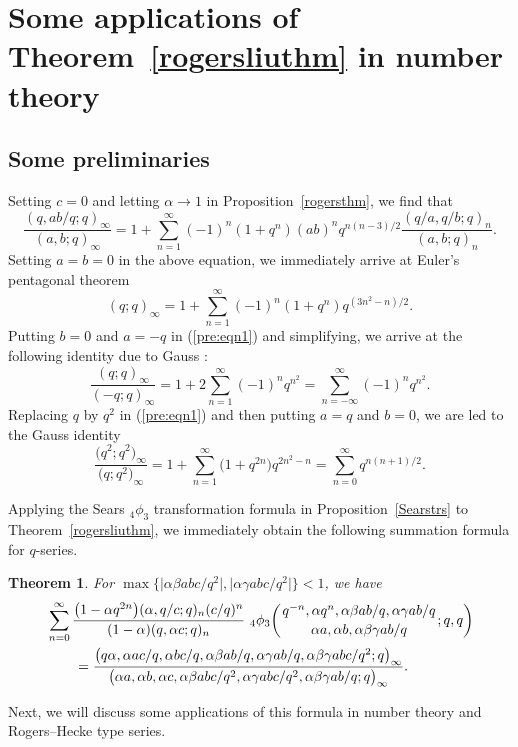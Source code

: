 \documentclass[pdftex]{sigma}
\numberwithin{equation}{section}
\newtheorem{Theorem}{Theorem}[section]
\begin{document}
\section{Some applications of Theorem~\ref{rogersliuthm} in number theory}\label{sec4}
\subsection{Some preliminaries}
Setting $c=0$ and letting $\alpha \to 1$ in Proposition~\ref{rogersthm}, we find that
\begin{equation} \label{pre:eqn1}
	\frac{(q, ab/q; q)_\infty}{(a, b; q)_\infty}
	=1+\sum_{n=1}^\infty (-1)^n (1+q^n) (ab)^n q^{n(n-3)/2} \frac{(q/a, q/b; q)_n}{(a, b; q)_n}.
\end{equation}
Setting $a=b=0$ in the above equation, we immediately arrive at Euler's pentagonal theo\-rem~\mbox{\cite[equation~(15)]{Gas+Rah}}%
\begin{equation*}%
	(q; q)_\infty=1+\sum_{n=1}^\infty (-1)^n (1+q^n) q^{(3n^2-n)/2}.
\end{equation*}
Putting $b=0$ and $a=-q$ in (\ref{pre:eqn1}) and simplifying, we arrive at the following identity due to Gauss \cite[p.~347]{Liu2010pacific}:
\begin{equation}\label{pre:eqn3}
	\frac{(q; q)_\infty}{(-q; q)_\infty}
	=1+2\sum_{n=1}^\infty (-1)^n q^{n^2}
	=\sum_{n=-\infty}^\infty (-1)^n q^{n^2}.
\end{equation}
Replacing $q$ by $q^2$ in (\ref{pre:eqn1}) and then putting $a=q$ and $b=0$, we are led to the Gauss iden\-tity~\mbox{\cite[p.~347]{Liu2010pacific}}
\begin{equation}\label{pre:eqn4}
	\frac{\bigl(q^2; q^2\bigr)_\infty}{\bigl(q; q^2\bigr)_\infty}
	=1+\sum_{n=1}^\infty \bigl(1+q^{2n}\bigr) q^{2n^2-n}
	=\sum_{n=0}^\infty q^{n(n+1)/2}.
\end{equation}

Applying the Sears $_4\phi_3$ transformation formula in Proposition~\ref{Searstrs}
to Theorem~\ref{rogersliuthm}, we immediately obtain the following summation formula for $q$-series.
\begin{Theorem}\label{prodliuthm}
	For $\max\bigl\{\bigl|\alpha \beta abc/q^2\bigr|, \bigl|\alpha \gamma abc/q^2\bigr|\bigr\}<1$, we have
	\begin{align*}
		&\sum_{n=0}^\infty \frac{\bigl(1-\alpha q^{2n}\bigr)(\alpha, q/c; q)_n (c/q)^n}{(1-\alpha)(q, \alpha c; q)_n}~ {_4 \phi_3} \biggl({{q^{-n}, \alpha q^n, \alpha \beta ab/q, \alpha \gamma ab/q}
			\atop{\alpha a, \alpha b,\alpha \beta \gamma ab/q}}; q, q\biggr)\\
		&\qquad{}=\frac{\bigl(q\alpha, \alpha ac/q, \alpha bc/q, \alpha \beta ab/q, \alpha \gamma ab/q, \alpha \beta \gamma abc/q^2; q\bigr)_\infty}
		{\bigl(\alpha a, \alpha b, \alpha c, \alpha \beta abc/q^2, \alpha \gamma abc/q^2, \alpha \beta \gamma ab/q; q \bigr)_\infty}.
	\end{align*}
\end{Theorem}
Next, we will discuss some applications of this formula in number theory and Rogers--Hecke type series.
\end{document}

